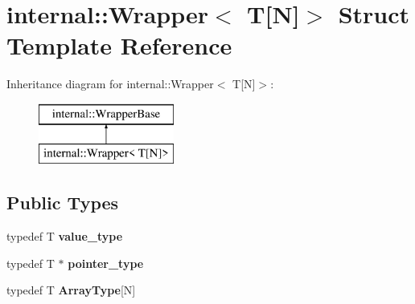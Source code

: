 \hypertarget{structinternal_1_1Wrapper_3_01T[N]_4}{}\section{internal\+:\+:Wrapper$<$ T\mbox{[}N\mbox{]}$>$ Struct Template Reference}
\label{structinternal_1_1Wrapper_3_01T[N]_4}
Inheritance diagram for internal\+:\+:Wrapper$<$ T\mbox{[}N\mbox{]}$>$\+:\begin{figure}[H]
\begin{center}
\leavevmode
\includegraphics[height=2.000000cm]{structinternal_1_1Wrapper_3_01T[N]_4}
\end{center}
\end{figure}
\subsection*{Public Types}
\begin{DoxyCompactItemize}
\item 
\hypertarget{structinternal_1_1Wrapper_3_01T[N]_4_ac64c85d6354cae342f08e655f38c7825}{}typedef T {\bfseries value\+\_\+type}\label{structinternal_1_1Wrapper_3_01T[N]_4_ac64c85d6354cae342f08e655f38c7825}

\item 
\hypertarget{structinternal_1_1Wrapper_3_01T[N]_4_a6f87a36babf793ce313ddf761c014416}{}typedef T $\ast$ {\bfseries pointer\+\_\+type}\label{structinternal_1_1Wrapper_3_01T[N]_4_a6f87a36babf793ce313ddf761c014416}

\item 
\hypertarget{structinternal_1_1Wrapper_3_01T[N]_4_af15f5d9933e193e71fbaaff87c2ccc94}{}typedef T {\bfseries Array\+Type}\mbox{[}N\mbox{]}\label{structinternal_1_1Wrapper_3_01T[N]_4_af15f5d9933e193e71fbaaff87c2ccc94}

\end{DoxyCompactItemize}
